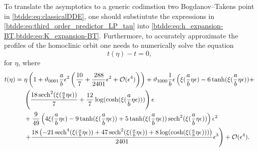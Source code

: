 To translate the asymptotics to a generic codimstion two Bogdanov--Takens point
in \cref{btdde:eq:classicalDDE}, one should substiutute the expressions in
\cref{btdde:eq:third_order_predictor_LP_tau} into \cref{btdde:eq:h_expansion-BT,btdde:eq:K_expansion-BT}.
Furthermore, to accurately approximate the profiles of the homoclinic orbit one needs to numerically solve
the equation 
\begin{equation*}
    t(\eta) - t = 0,
\end{equation*}
for $\eta$, where
\begin{equation*}
\label{btdde:eq:tOfTau}
\begin{aligned}
    t(\eta) ={}& \eta \left( 1 + \vartheta_{0001}\frac{a}{b}\epsilon^2\left(\frac{10}{7}+ \frac{288}{2401} \epsilon^2 + \mathcal{O}(\epsilon^4) \right) \right) + 
				 \vartheta_{1000} \frac1{b} \epsilon \left( \xi(\frac{a}{b}\eta\epsilon) -6 \tanh (\xi(\frac{a}{b}\eta\epsilon) ) + \right. \\
               &\left( \frac{18 \operatorname{sech}^2(\xi(\frac{a}{b}\eta\epsilon) )}{7}+\frac{12}{7} \log (\cosh (\xi(\frac{a}{b}\eta\epsilon) )) \right) \epsilon \\ 
               & +\frac{9}{49} \left(4 \xi(\frac{a}{b}\eta\epsilon) -9 \tanh (\xi(\frac{a}{b}\eta\epsilon) )+5 \tanh (\xi(\frac{a}{b}\eta\epsilon) ) \operatorname{sech}^2(\xi(\frac{a}{b}\eta\epsilon))\right) \epsilon^2 \\ 
               & \left. +\frac{18 \left(-21 \operatorname{sech}^4(\xi(\frac{a}{b}\eta\epsilon) )+47 \operatorname{sech}^2(\xi(\frac{a}{b}\eta\epsilon) )+8 \log (\cosh (\xi(\frac{a}{b}\eta\epsilon) ))\right)}{2401} \epsilon^3 \right) + \mathcal{O}(\epsilon^4).
\end{aligned}
\end{equation*}

